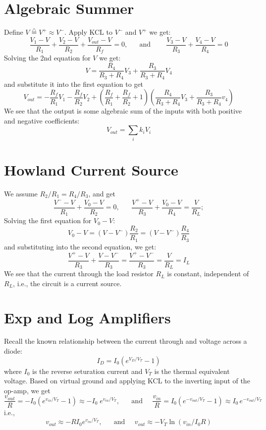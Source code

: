 \documentclass{article}
\begin{document}
\section*{Algebraic Summer}


  Define $V\stackrel{\triangle}{=}V^+ \approx V^- $. Apply KCL to $V^-$ 
  and $V^+$ we get:
  \[
  \frac{V_1-V}{R_1}+\frac{V_2-V}{R_2}+\frac{V_{out}-V}{R_f}=0,\;\;\;\;\;\;
  \mbox{and}\;\;\;\;\;\;\;\;
  \frac{V_3-V}{R_3}+\frac{V_4-V}{R_4}=0 
  \]
  Solving the 2nd equation for $V$ we get:
  \[
  V=\frac{R_4}{R_3+R_4} V_3 + \frac{R_3}{R_3+R_4} V_4	
  \]
  and substitute it into the first equation to get
  \[
  V_{out}=-\frac{R_f}{R_1}V_1-\frac{R_f}{R_2}V_2
  +\left(\frac{R_f}{R_1}+\frac{R_f}{R_2}+1\right)
  \left(\frac{R_4}{R_3+R_4} V_3+\frac{R_3}{R_3+R_4} v_4\right) 
  \]
  We see that the output is some algebraic sum of the inputs with both 
  positive and negative coefficients:
  \[
  V_{out}=\sum_i k_iV_i
  \]

\section*{Howland Current Source}


  We assume $R_2/R_1=R_4/R_3$, and get
  \[
  \frac{V^--V}{R_1}+\frac{V_0-V}{R_2}=0,\;\;\;\;\;\;
  \frac{V^+-V}{R_3}+\frac{V_0-V}{R_4}=\frac{V}{R_L};
  \]
  Solving the first equation for $V_0-V$:
  \[
  V_0-V=(V-V^-)\frac{R_2}{R_1}=(V-V^-)\frac{R_4}{R_3}
  \]
  and substituting into the second equation, we get:
  \[
  \frac{V^+-V}{R_3}+\frac{V-V^-}{R_3}
  =\frac{V^+-V^-}{R_3}=\frac{V}{R_L}=I_L
  \]
  We see that the current through the load resistor $R_L$
  is constant, independent of $R_L$, i.e., the circuit is
  a current source.


\section*{Exp and Log Amplifiers}


  Recall the known relationship between the current through and 
  voltage across a diode:
  \[
  I_D=I_0 \left( e^{V_D/V_T}-1 \right)
  \]
  where $I_0$ is the reverse seturation current and $V_T$ is the
  thermal equivalent voltage. Based on virtual ground and applying 
  KCL to the inverting input of the op-amp, we get
  \[
  \frac{v_{out}}{R}=-I_0(e^{v_{in}/V_T}-1)\approx -I_0\;e^{v_{in}/V_T},
  \;\;\;\;\;\;\mbox{and}\;\;\;\;\;
  \frac{v_{in}}{R}=I_0(e^{-v_{out}/V_T}-1)\approx I_0\,e^{-v_{out}/V_T}
  \]
  i.e.,
  \[
  v_{out}\approx -R I_0 e^{v_{in}/V_T},\;\;\;\;\;\;\mbox{and}\;\;\;\;\;
  v_{out}\approx -V_T\ln(v_{in}/I_0R)
  \]
\end{document}

